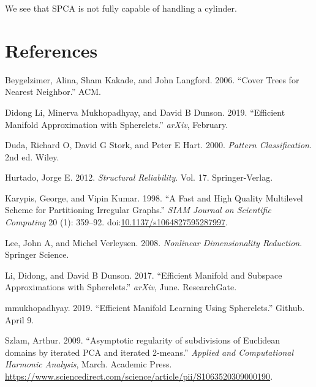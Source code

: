 \documentclass[]{article}
\begin{document}
We see that SPCA is not fully capable of handling a cylinder.

\newpage

\section{References}

\hypertarget{refs}{}
\hypertarget{ref-beygelzimer2006}{}
Beygelzimer, Alina, Sham Kakade, and John Langford. 2006. ``Cover Trees
for Nearest Neighbor.'' ACM.

\hypertarget{ref-li2019}{}
Didong Li, Minerva Mukhopadhyay, and David B Dunson. 2019. ``Efficient
Manifold Approximation with Spherelets.'' \emph{arXiv}, February.

\hypertarget{ref-duda2000}{}
Duda, Richard O, David G Stork, and Peter E Hart. 2000. \emph{Pattern
Classification}. 2nd ed. Wiley.

\hypertarget{ref-hurtado2012}{}
Hurtado, Jorge E. 2012. \emph{Structural Reliability}. Vol. 17.
Springer-Verlag.

\hypertarget{ref-karypis1998}{}
Karypis, George, and Vipin Kumar. 1998. ``A Fast and High Quality
Multilevel Scheme for Partitioning Irregular Graphs.'' \emph{SIAM
Journal on Scientific Computing} 20 (1): 359--92.
doi:\href{https://doi.org/10.1137/s1064827595287997}{10.1137/s1064827595287997}.

\hypertarget{ref-lee2008}{}
Lee, John A, and Michel Verleysen. 2008. \emph{Nonlinear Dimensionality
Reduction}. Springer Science.

\hypertarget{ref-li2017}{}
Li, Didong, and David B Dunson. 2017. ``Efficient Manifold and Subspace
Approximations with Spherelets.'' \emph{arXiv}, June. ResearchGate.

\hypertarget{ref-github}{}
mmukhopadhyay. 2019. ``Efficient Manifold Learning Using Spherelets.''
Github. April 9.

\hypertarget{ref-szlam2009}{}
Szlam, Arthur. 2009. ``Asymptotic regularity of subdivisions of
Euclidean domains by iterated PCA and iterated 2-means.'' \emph{Applied
and Computational Harmonic Analysis}, March. Academic Press.
\url{https://www.sciencedirect.com/science/article/pii/S1063520309000190}.
\end{document}
